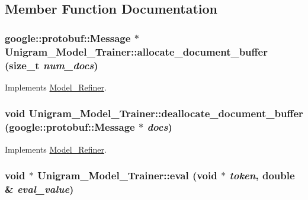 \subsection{Member Function Documentation}
\hypertarget{class_unigram___model___trainer_a92e5a9c1dcd4f1fdf4a2b158f6b31c7b}{
\subsubsection[{allocate\_\-document\_\-buffer}]{\setlength{\rightskip}{0pt plus 5cm}google::protobuf::Message $\ast$ Unigram\_\-Model\_\-Trainer::allocate\_\-document\_\-buffer (size\_\-t {\em num\_\-docs})}}
\label{class_unigram___model___trainer_a92e5a9c1dcd4f1fdf4a2b158f6b31c7b}


Implements \hyperlink{class_model___refiner_a516dd37d4b76cceeb18e6bdf269b8b04}{Model\_\-Refiner}.

\hypertarget{class_unigram___model___trainer_aa5f8c8441588c341c42ec6685bc313d7}{
\subsubsection[{deallocate\_\-document\_\-buffer}]{\setlength{\rightskip}{0pt plus 5cm}void Unigram\_\-Model\_\-Trainer::deallocate\_\-document\_\-buffer (google::protobuf::Message $\ast$ {\em docs})}}
\label{class_unigram___model___trainer_aa5f8c8441588c341c42ec6685bc313d7}


Implements \hyperlink{class_model___refiner_a3787b875dfd41de8db8b1e46cfe40d16}{Model\_\-Refiner}.

\hypertarget{class_unigram___model___trainer_a354f9cc690b803bc17284b6742702a66}{
\subsubsection[{eval}]{\setlength{\rightskip}{0pt plus 5cm}void $\ast$ Unigram\_\-Model\_\-Trainer::eval (void $\ast$ {\em token}, \/  double \& {\em eval\_\-value})}}
\label{class_unigram___model___trainer_a354f9cc690b803bc17284b6742702a66}


